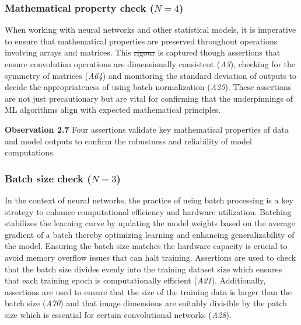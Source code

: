 \documentclass[smallextended]{svjour3}       %
\newcommand{\highlight}[1]{\begin{framed}%
  \noindent#1
\end{framed}}
\providecommand{\DIFadd}[1]{{\protect\color{blue}\uwave{#1}}} %
\providecommand{\DIFdel}[1]{{\protect\color{red}\sout{#1}}} %
\providecommand{\DIFaddbegin}{} %
\providecommand{\DIFaddend}{} %
\providecommand{\DIFdelbegin}{} %
\providecommand{\DIFdelend}{} %
\newcommand{\DIFscaledelfig}{0.5}
\newlength{\DIFdelgraphicswidth} %
\newlength{\DIFdelgraphicsheight} %
\newcommand{\DIFaddincludegraphics}[2][]{{\color{blue}\fbox{\DIFOincludegraphics[#1]{#2}}}} %
\newcommand{\DIFdelincludegraphics}[2][]{%
\sbox{\DIFdelgraphicsbox}{\DIFOincludegraphics[#1]{#2}}%
\settoboxwidth{\DIFdelgraphicswidth}{\DIFdelgraphicsbox} %
\settoboxtotalheight{\DIFdelgraphicsheight}{\DIFdelgraphicsbox} %
\scalebox{\DIFscaledelfig}{%
\parbox[b]{\DIFdelgraphicswidth}{\usebox{\DIFdelgraphicsbox}\\[-\baselineskip] \rule{\DIFdelgraphicswidth}{0em}}\llap{\resizebox{\DIFdelgraphicswidth}{\DIFdelgraphicsheight}{%
\setlength{\unitlength}{\DIFdelgraphicswidth}%
\begin{picture}(1,1)%
\thicklines\linethickness{2pt} %
{\color[rgb]{1,0,0}\put(0,0){\framebox(1,1){}}}%
{\color[rgb]{1,0,0}\put(0,0){\line( 1,1){1}}}%
{\color[rgb]{1,0,0}\put(0,1){\line(1,-1){1}}}%
\end{picture}%
}\hspace*{3pt}}} %
} %
\DeclareRobustCommand{\DIFaddbegin}{\DIFOaddbegin \let\includegraphics\DIFaddincludegraphics} %
\DeclareRobustCommand{\DIFaddend}{\DIFOaddend \let\includegraphics\DIFOincludegraphics} %
\DeclareRobustCommand{\DIFdelbegin}{\DIFOdelbegin \let\includegraphics\DIFdelincludegraphics} %
\DeclareRobustCommand{\DIFdelend}{\DIFOaddend \let\includegraphics\DIFOincludegraphics} %
\begin{document}
\subsubsection{Mathematical property check ($N = 4$)}

When working with neural networks and other statistical models, it is imperative to ensure that mathematical properties are preserved throughout operations involving arrays and matrices. This \DIFdelbegin \DIFdel{rigour }\DIFdelend \DIFaddbegin \DIFadd{rigor }\DIFaddend is captured though assertions that ensure convolution operations are dimensionally consistent (\emph{A3}), checking for the symmetry of matrices (\emph{A64}) and monitoring the standard deviation of outputs to decide the appropriateness of using batch normalization (\emph{A25}). These assertions are not just precautionary but are vital for confirming that the underpinnings of ML algorithms align with expected mathematical principles.

\DIFdelbegin %
\DIFdelend \DIFaddbegin \highlight{\textbf{Observation 2.7} Four assertions validate key mathematical properties of data and model outputs to confirm the robustness and reliability of model computations.}
\DIFaddend 

\subsubsection{Batch size check ($N = 3$)}

In the context of neural networks, the practice of using batch processing is a key strategy to enhance computational efficiency and hardware utilization. Batching stabilizes the learning curve by updating the model weights based on the average gradient of a batch thereby optimizing learning and enhancing generalizability of the model. Ensuring the batch size matches the hardware capacity is crucial to avoid memory overflow issues that can halt training. Assertions are used to check that the batch size divides evenly into the training dataset size which ensures that each training epoch is computationally efficient (\emph{A21}). Additionally, assertions are used to ensure that the size of the training data is larger than the batch size (\emph{A70}) and that image dimensions are suitably divisible by the patch size which is essential for certain convolutional networks (\emph{A28}).
\end{document}
